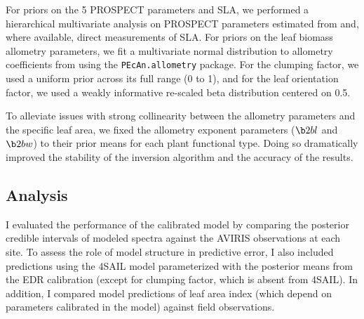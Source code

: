 For priors on the 5 PROSPECT parameters and SLA, we performed a hierarchical multivariate analysis \citep{shiklomanov2020does} on PROSPECT parameters estimated from \citep[][Chapter 3]{shiklomanov_dissertation} and, where available, direct measurements of SLA.
For priors on the leaf biomass allometry parameters, we fit a multivariate normal distribution to allometry coefficients from \citet{jenkins_2003_allom,jenkins_2004_allom} using the \texttt{PEcAn.allometry} package.
For the clumping factor, we used a uniform prior across its full range (0 to 1), and for the leaf orientation factor, we used a weakly informative re-scaled beta distribution centered on 0.5.

To alleviate issues with strong collinearity between the allometry parameters and the specific leaf area, we fixed the allometry exponent parameters ($\b2bl$ and $\b2bw$) to their prior means for each plant functional type.
Doing so dramatically improved the stability of the inversion algorithm and the accuracy of the results.

\subsection{Analysis}

I evaluated the performance of the calibrated model by comparing the posterior credible intervals of modeled spectra against the AVIRIS observations at each site.
To assess the role of model structure in predictive error, I also included predictions using the 4SAIL model parameterized with the posterior means from the EDR calibration (except for clumping factor, which is absent from 4SAIL).
In addition, I compared model predictions of leaf area index (which depend on parameters calibrated in the model) against field observations.

